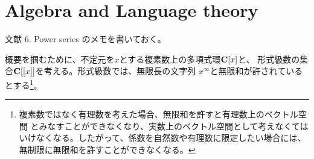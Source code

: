 \begingroup %
	\newcommand{\Word}{\mycal{W}}
	\newcommand{\W}{\Word}
	\newcommand{\What}{\widehat{\Word}}
	\newcommand{\Group}{\mycal{G}}
	\newcommand{\G}{\Group}
	\newcommand{\Tensor}{\mycal{T}}
	\newcommand{\T}{\Tensor}
	\newcommand{\End}{\myop{End}}
	\newcommand{\Vect}{\mybf{Vec}}
	\newcommand{\Alg}{\mybf{Alg}}
	\newcommand{\Mod}[1]{{#1}\myhere\mybf{Mod}}
	\newcommand{\Rep}[1]{{#1}\myhere\mybf{Rep}}
	\newcommand{\Ab}{\mybf{Ab}}
	\newcommand{\dup}{\myop{du}}
	\newcommand{\ofm}{only finitely many }
	\newcommand{\id}{\myop{id}}
	\newcommand{\im}{\myop{im}}
	\newcommand{\onto}{\myop{onto}}
	\newcommand{\such}{{\;\myop{s.t.}\;}}
	\newcommand{\tran}{\mathbf{t}}
	\newcommand{\brzo}{\mathbf{b}}
	\newcommand{\shuf}{\mathbf{s}}
\section{Algebra and Language theory}\label{s1:Algebra and Language theory} %
	文献\cite{Cohn75algebraand} 6. Power series のメモを書いておく。

	概要を掴むために、不定元を$x$とする複素数上の多項式環$\mathbf{C}[x]$と、
	形式級数の集合$\mathbf{C}[[x]]$を考える。形式級数では、無限長の文字列
	$x^\infty$と無限和が許されているとする\footnote{
		複素数ではなく有理数を考えた場合、無限和を許すと有理数上のベクトル空間
		とみなすことができなくなり、実数上のベクトル空間として考えなくては
		いけなくなる。したがって、係数を自然数や有理数に限定したい場合には、
		無制限に無限和を許すことができなくなる。
	}。

